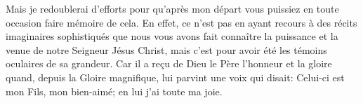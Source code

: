 Mais je redoublerai d’efforts pour qu’après mon départ
	vous puissiez en toute occasion faire mémoire de cela.
En effet, ce n’est pas en ayant recours à des récits imaginaires sophistiqués
	que nous vous avons fait connaître la puissance
		et la venue de notre Seigneur Jésus Christ,
	mais c’est pour avoir été les témoins oculaires de sa grandeur.
Car il a reçu de Dieu le Père l’honneur et la gloire
	quand, depuis la Gloire magnifique, lui parvint une voix qui disait:
	Celui-ci est mon Fils, mon bien-aimé; en lui j’ai toute ma joie.
